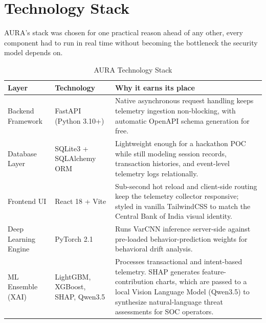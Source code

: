 \documentclass[11pt,journal,onecolumn]{article}
\begin{document}
\section{Technology Stack}
AURA's stack was chosen for one practical reason ahead of any other, every component had to run in real time without becoming the bottleneck the security model depends on.


\begin{table}[htbp]
\centering
\begin{tabular}{p{3.1cm}p{3.3cm}p{7.8cm}}
\hline

\textbf{Layer} & \textbf{Technology} & \textbf{Why it earns its place} \\
\hline
Backend Framework & FastAPI (Python 3.10+) & Native asynchronous request handling keeps telemetry ingestion non-blocking, with automatic OpenAPI schema generation for free. \\
Database Layer & SQLite3 + SQLAlchemy ORM & Lightweight enough for a hackathon POC while still modeling session records, transaction histories, and event-level telemetry logs relationally. \\
Frontend UI & React 18 + Vite & Sub-second hot reload and client-side routing keep the telemetry collector responsive; styled in vanilla TailwindCSS to match the Central Bank of India visual identity. \\
Deep Learning Engine & PyTorch 2.1 & Runs VarCNN inference server-side against pre-loaded behavior-prediction weights for behavioral drift analysis. \\
ML Ensemble (XAI) & LightGBM, XGBoost, SHAP, Qwen3.5 & Processes transactional and intent-based telemetry. SHAP generates feature-contribution charts, which are passed to a local Vision Language Model (Qwen3.5) to synthesize natural-language threat assessments for SOC operators. \\
\hline
\end{tabular}
\caption{AURA Technology Stack}
\label{tab:stack}
\end{table}
\end{document}
